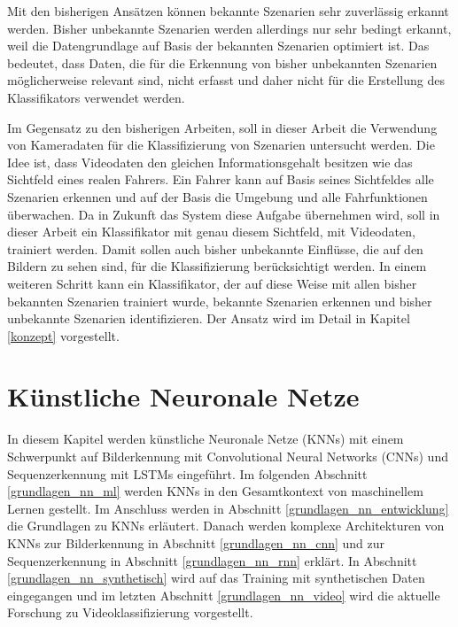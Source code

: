 Mit den bisherigen Ansätzen können bekannte Szenarien sehr zuverlässig erkannt werden. Bisher unbekannte Szenarien werden allerdings nur sehr bedingt erkannt, weil die Datengrundlage auf Basis der bekannten Szenarien optimiert ist. Das bedeutet, dass Daten, die für die Erkennung von bisher unbekannten Szenarien möglicherweise relevant sind, nicht erfasst und daher nicht für die Erstellung des Klassifikators verwendet werden.

Im Gegensatz zu den bisherigen Arbeiten, soll in dieser Arbeit die Verwendung von Kameradaten für die Klassifizierung von Szenarien untersucht werden. Die Idee ist, dass Videodaten den gleichen Informationsgehalt besitzen wie das Sichtfeld eines realen Fahrers. Ein Fahrer kann auf Basis seines Sichtfeldes alle Szenarien erkennen und auf der Basis die Umgebung und alle Fahrfunktionen überwachen. Da in Zukunft das System diese Aufgabe übernehmen wird, soll in dieser Arbeit ein Klassifikator mit genau diesem Sichtfeld, mit Videodaten, trainiert werden. Damit sollen auch bisher unbekannte Einflüsse, die auf den Bildern zu sehen sind, für die Klassifizierung berücksichtigt werden. In einem weiteren Schritt kann ein Klassifikator, der auf diese Weise mit allen bisher bekannten Szenarien trainiert wurde, bekannte Szenarien erkennen und bisher unbekannte Szenarien identifizieren. Der Ansatz wird im Detail in Kapitel \ref{konzept} vorgestellt.

\section{Künstliche Neuronale Netze}
\label{grundlagen_nn}

In diesem Kapitel werden künstliche Neuronale Netze (\acp{KNN}) mit einem Schwerpunkt auf Bilderkennung mit Convolutional Neural Networks (\acp{CNN}) und Sequenzerkennung mit \acfp{LSTM} eingeführt. Im folgenden Abschnitt \ref{grundlagen_nn_ml} werden \acp{KNN} in den Gesamtkontext von maschinellem Lernen gestellt. Im Anschluss werden in Abschnitt \ref{grundlagen_nn_entwicklung} die Grundlagen zu \acp{KNN} erläutert. Danach werden komplexe Architekturen von \acp{KNN} zur Bilderkennung in Abschnitt \ref{grundlagen_nn_cnn} und zur Sequenzerkennung in Abschnitt \ref{grundlagen_nn_rnn} erklärt. In Abschnitt \ref{grundlagen_nn_synthetisch} wird auf das Training mit synthetischen Daten eingegangen und im letzten Abschnitt \ref{grundlagen_nn_video} wird die aktuelle Forschung zu Videoklassifizierung vorgestellt.

